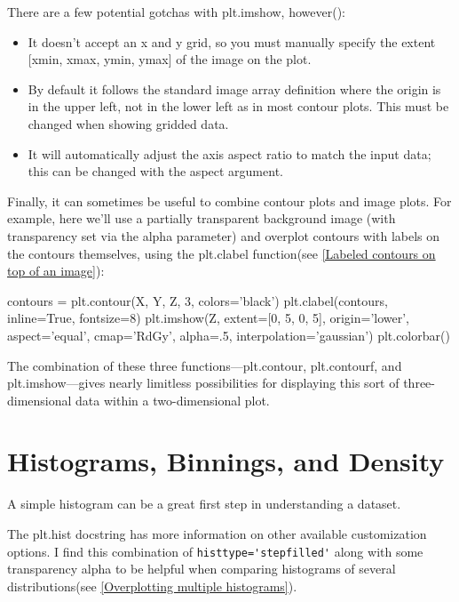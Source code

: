 There are a few potential gotchas with plt.imshow, however():
\begin{itemize}
    \item It doesn't accept an x and y grid, so you must manually specify the extent [xmin,
                  xmax, ymin, ymax] of the image on the plot.
    \item By default it follows the standard image array definition where the origin is in the
          upper left, not in the lower left as in most contour plots. This must be changed
          when showing gridded data.
    \item It will automatically adjust the axis aspect ratio to match the input data; this can
          be changed with the aspect argument.
\end{itemize}

Finally, it can sometimes be useful to combine contour plots and image plots. For
example, here we'll use a partially transparent background image (with transparency
set via the alpha parameter) and overplot contours with labels on the contours themselves, using the plt.clabel function(see \autoref{Labeled contours on top of an image}):



\begin{pyc}
    contours = plt.contour(X, Y, Z, 3, colors='black')
    plt.clabel(contours, inline=True, fontsize=8)
    plt.imshow(Z, extent=[0, 5, 0, 5], origin='lower', aspect='equal',
    cmap='RdGy', alpha=.5, interpolation='gaussian')
    plt.colorbar()
\end{pyc}

The combination of these three functions—plt.contour, plt.contourf, and
plt.imshow—gives nearly limitless possibilities for displaying this sort of three-
dimensional data within a two-dimensional plot.

\section{Histograms, Binnings, and Density}
A simple histogram can be a great first step in understanding a dataset.

The plt.hist docstring has more information on other available customization
options. I find this combination of \verb|histtype='stepfilled'| along with some transparency alpha to be helpful when comparing histograms of several distributions(see \autoref{Overplotting multiple histograms}).

